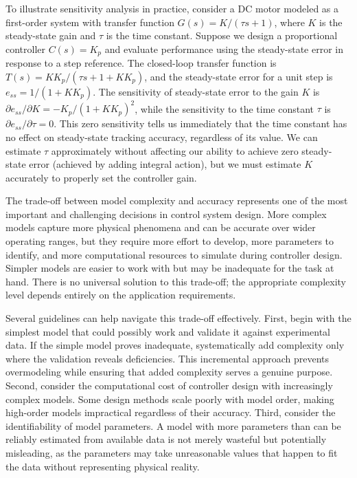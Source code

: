 To illustrate sensitivity analysis in practice, consider a DC motor modeled as a first-order system with transfer function $G(s) = K / (\tau s + 1)$, where $K$ is the steady-state gain and $\tau$ is the time constant. Suppose we design a proportional controller $C(s) = K_p$ and evaluate performance using the steady-state error in response to a step reference. The closed-loop transfer function is $T(s) = K K_p / (\tau s + 1 + K K_p)$, and the steady-state error for a unit step is $e_{ss} = 1 / (1 + K K_p)$. The sensitivity of steady-state error to the gain $K$ is $\partial e_{ss} / \partial K = -K_p / (1 + K K_p)^2$, while the sensitivity to the time constant $\tau$ is $\partial e_{ss} / \partial \tau = 0$. This zero sensitivity tells us immediately that the time constant has no effect on steady-state tracking accuracy, regardless of its value. We can estimate $\tau$ approximately without affecting our ability to achieve zero steady-state error (achieved by adding integral action), but we must estimate $K$ accurately to properly set the controller gain.

The trade-off between model complexity and accuracy represents one of the most important and challenging decisions in control system design. More complex models capture more physical phenomena and can be accurate over wider operating ranges, but they require more effort to develop, more parameters to identify, and more computational resources to simulate during controller design. Simpler models are easier to work with but may be inadequate for the task at hand. There is no universal solution to this trade-off; the appropriate complexity level depends entirely on the application requirements.

Several guidelines can help navigate this trade-off effectively. First, begin with the simplest model that could possibly work and validate it against experimental data. If the simple model proves inadequate, systematically add complexity only where the validation reveals deficiencies. This incremental approach prevents overmodeling while ensuring that added complexity serves a genuine purpose. Second, consider the computational cost of controller design with increasingly complex models. Some design methods scale poorly with model order, making high-order models impractical regardless of their accuracy. Third, consider the identifiability of model parameters. A model with more parameters than can be reliably estimated from available data is not merely wasteful but potentially misleading, as the parameters may take unreasonable values that happen to fit the data without representing physical reality.

